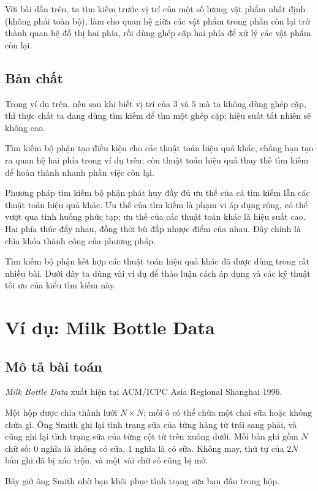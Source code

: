 \documentclass[11pt]{article}
\begin{document}
Với bài dẫn trên, ta tìm kiếm trước vị trí của một số lượng vật phẩm nhất định
(không phải toàn bộ), làm cho quan hệ giữa các vật phẩm trong phần còn lại trở
thành quan hệ đồ thị hai phía, rồi dùng ghép cặp hai phía để xử lý các vật
phẩm còn lại.

\subsection{Bản chất}

Trong ví dụ trên, nếu sau khi biết vị trí của $3$ và $5$ mà ta không dùng ghép
cặp, thì thực chất ta đang dùng tìm kiếm để tìm một ghép cặp; hiệu suất tất
nhiên sẽ không cao.

Tìm kiếm bộ phận tạo điều kiện cho các thuật toán hiệu quả khác, chẳng hạn
tạo ra quan hệ hai phía trong ví dụ trên; còn thuật toán hiệu quả thay thế tìm
kiếm để hoàn thành nhanh phần việc còn lại.

Phương pháp tìm kiếm bộ phận phát huy đầy đủ ưu thế của cả tìm kiếm lẫn các
thuật toán hiệu quả khác. Ưu thế của tìm kiếm là phạm vi áp dụng rộng, có thể
vượt qua tình huống phức tạp; ưu thế của các thuật toán khác là hiệu suất cao.
Hai phía thúc đẩy nhau, đồng thời bù đắp nhược điểm của nhau. Đây chính là
chìa khóa thành công của phương pháp.

Tìm kiếm bộ phận kết hợp các thuật toán hiệu quả khác đã được dùng trong rất
nhiều bài. Dưới đây ta dùng vài ví dụ để thảo luận cách áp dụng và các kỹ
thuật tối ưu của kiểu tìm kiếm này.

\section{Ví dụ: Milk Bottle Data}

\subsection{Mô tả bài toán}

\textit{Milk Bottle Data} xuất hiện tại ACM/ICPC Asia Regional Shanghai 1996.

Một hộp được chia thành lưới $N\times N$; mỗi ô có thể chứa một chai sữa hoặc
không chứa gì. Ông Smith ghi lại tình trạng sữa của từng hàng từ trái sang
phải, và cũng ghi lại tình trạng sữa của từng cột từ trên xuống dưới. Mỗi bản
ghi gồm $N$ chữ số: $0$ nghĩa là không có sữa, $1$ nghĩa là có sữa. Không may,
thứ tự của $2N$ bản ghi đã bị xáo trộn, và một vài chữ số cũng bị mờ.

Bây giờ ông Smith nhờ bạn khôi phục tình trạng sữa ban đầu trong hộp.
\end{document}
